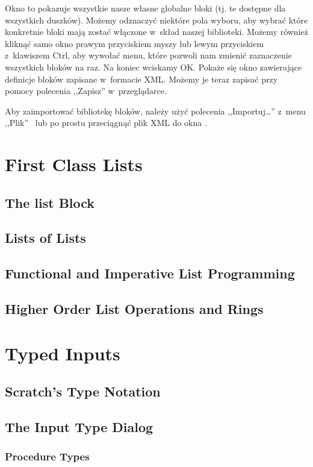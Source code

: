 \documentclass[a4paper]{report}
\begin{document}

Okno to pokazuje wszystkie nasze własne globalne bloki (tj. te dostępne dla wszystkich duszków). Możemy odznaczyć niektóre pola wyboru, aby wybrać które konkretnie bloki mają zostać włączone w~skład naszej biblioteki. Możemy również kliknąć samo okno prawym przyciskiem myszy lub lewym przyciskiem z~klawiszem Ctrl, aby wywołać menu, które pozwoli nam zmienić zaznaczenie wszystkich bloków na raz. Na koniec wciskamy OK. Pokaże się okno zawierające definicje bloków zapisane w~formacie XML. Możemy je teraz zapisać przy pomocy polecenia ,,Zapisz'' w~przeglądarce.

Aby zaimportować bibliotekę bloków, należy użyć polecenia ,,Importuj\ldots'' z~menu ,,Plik''~ lub po prostu przeciągnąć plik XML do okna .

\chapter{First Class Lists}
\section{The list Block}
\section{Lists of Lists}
\section{Functional and Imperative List Programming}
\section{Higher Order List Operations and Rings}
\chapter{Typed Inputs}
\section{Scratch's Type Notation}
\section{The \Snap{} Input Type Dialog}
\subsection{Procedure Types}
\end{document}

